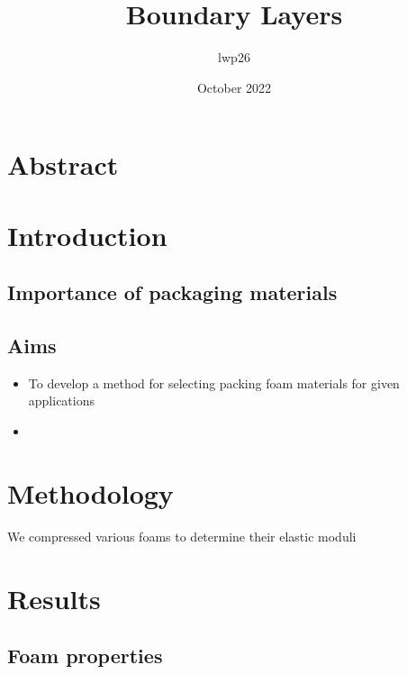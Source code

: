 \documentclass{article}
\begin{document}
\title{Boundary Layers}
\author{lwp26 }
\date{October 2022}
\maketitle

\section{Abstract}

\section{Introduction}

\subsection{Importance of packaging materials}

\subsection{Aims}

\begin{itemize}
\item To develop a method for selecting packing foam materials for given applications
\item 
\end{itemize}

\section{Methodology}

We compressed various foams to determine their elastic moduli


\section{Results}


\subsection{Foam properties}
\end{document}
